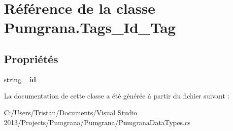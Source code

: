 \hypertarget{class_pumgrana_1_1_tags___id___tag}{\section{Référence de la classe Pumgrana.\+Tags\+\_\+\+Id\+\_\+\+Tag}
\label{class_pumgrana_1_1_tags___id___tag}
}
\subsection*{Propriétés}
\begin{DoxyCompactItemize}
\item 
\hypertarget{class_pumgrana_1_1_tags___id___tag_abbb5c218448e9b596cbf412407ead572}{string {\bfseries \+\_\+id}}\label{class_pumgrana_1_1_tags___id___tag_abbb5c218448e9b596cbf412407ead572}

\end{DoxyCompactItemize}


La documentation de cette classe a été générée à partir du fichier suivant \+:\begin{DoxyCompactItemize}
\item 
C\+:/\+Users/\+Tristan/\+Documents/\+Visual Studio 2013/\+Projects/\+Pumgrana/\+Pumgrana/Pumgrana\+Data\+Types.\+cs\end{DoxyCompactItemize}
